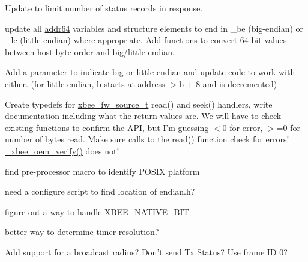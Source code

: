 \begin{DoxyRefList}
Update to limit number of status records in response.  
\item[\label{todo__todo000027}%
\hypertarget{todo__todo000027}{}%
Class \hyperlink{unionaddr64}{addr64} ]update all \hyperlink{unionaddr64}{addr64} variables and structure elements to end in \-\_\-be (big-\/endian) or \-\_\-le (little-\/endian) where appropriate. Add functions to convert 64-\/bit values between host byte order and big/little endian.  
\item[\label{todo__todo000005}%
\hypertarget{todo__todo000005}{}%
Global \hyperlink{group__wpan__types_ga448782f4aed0821758969b47221417ed}{addr64\-\_\-format} (char F\-A\-R $\ast$buffer, const \hyperlink{unionaddr64}{addr64} F\-A\-R $\ast$address)]Add a parameter to indicate big or little endian and update code to work with either. (for little-\/endian, b starts at address-\/$>$b + 8 and is decremented) 
\item[\label{todo__todo000028}%
\hypertarget{todo__todo000028}{}%
File \hyperlink{firmware_8h}{firmware.h} ]Create typedefs for \hyperlink{structxbee__fw__source__t}{xbee\-\_\-fw\-\_\-source\-\_\-t} read() and seek() handlers, write documentation including what the return values are. We will have to check existing functions to confirm the A\-P\-I, but I'm guessing $<$0 for error, $>$=0 for number of bytes read. Make sure calls to the read() function check for errors! \hyperlink{group__xbee__firmware_ga06368ad0d6cc0d4e92dbf36f8b233f90}{\-\_\-xbee\-\_\-oem\-\_\-verify()} does not!  
\item[\label{todo__todo000029}%
\hypertarget{todo__todo000029}{}%
File \hyperlink{platform_8h}{platform.h} ]find pre-\/processor macro to identify P\-O\-S\-I\-X platform  
\item[\label{todo__todo000030}%
\hypertarget{todo__todo000030}{}%
File \hyperlink{platform__posix_8h}{platform\-\_\-posix.h} ]need a configure script to find location of endian.\-h? 

figure out a way to handle X\-B\-E\-E\-\_\-\-N\-A\-T\-I\-V\-E\-\_\-B\-I\-T 

better way to determine timer resolution?  
\item[\label{todo__todo000025}%
\hypertarget{todo__todo000025}{}%
Global \hyperlink{group__wpan__aps_ga66b2c3b27a4e56cd04ba2f70841e2646}{wpan\-\_\-endpoint\-\_\-send\-\_\-fn} )(const \hyperlink{structwpan__envelope__t}{wpan\-\_\-envelope\-\_\-t} F\-A\-R $\ast$envelope, uint16\-\_\-t flags)]Add support for a broadcast radius? Don't send Tx Status? Use frame I\-D 0?


\end{DoxyRefList}
